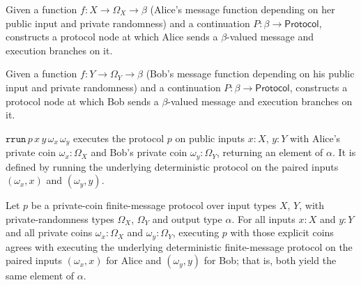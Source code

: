 \begin{definition}
\label{CommunicationComplexity.PrivateCoin.FiniteMessage.Protocol.alice}
\leanok
{}
Given a function $f : X \to \Omega_X \to \beta$ (Alice's message function depending on
her public input and private randomness) and a continuation $P : \beta \to
\mathsf{Protocol}$, constructs a protocol node at which Alice sends a $\beta$-valued
message and execution branches on it.
\end{definition}

\begin{definition}
\label{CommunicationComplexity.PrivateCoin.FiniteMessage.Protocol.bob}
\leanok
{}
Given a function $f : Y \to \Omega_Y \to \beta$ (Bob's message function depending on
his public input and private randomness) and a continuation $P : \beta \to
\mathsf{Protocol}$, constructs a protocol node at which Bob sends a $\beta$-valued
message and execution branches on it.
\end{definition}

\begin{definition}
\label{CommunicationComplexity.PrivateCoin.FiniteMessage.Protocol.rrun}
\leanok
{}
$\texttt{rrun}\,p\,x\,y\,\omega_x\,\omega_y$ executes the protocol $p$ on public inputs
$x : X$, $y : Y$ with Alice's private coin $\omega_x : \Omega_X$ and Bob's private coin
$\omega_y : \Omega_Y$, returning an element of $\alpha$.  It is defined by running the
underlying deterministic protocol on the paired inputs $(\omega_x, x)$ and
$(\omega_y, y)$.
\end{definition}

\begin{theorem}
\label{CommunicationComplexity.PrivateCoin.FiniteMessage.Protocol.rrun_eq}
\leanok
{}
Let $p$ be a private-coin finite-message protocol over input types $X$, $Y$, with
private-randomness types $\Omega_X$, $\Omega_Y$ and output type $\alpha$. For all inputs
$x : X$ and $y : Y$ and all private coins $\omega_x : \Omega_X$ and $\omega_y :
\Omega_Y$, executing $p$ with those explicit coins agrees with executing the underlying
deterministic finite-message protocol on the paired inputs $(\omega_x, x)$ for Alice and
$(\omega_y, y)$ for Bob; that is, both yield the same element of $\alpha$.
\end{theorem}

